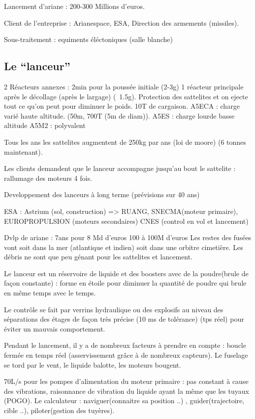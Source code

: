 \documentclass[a4paper,12pt]{article}
\begin{document}
Lancement d'ariane : 200-300 Millions d'euros.

Client de l'entreprise : Arianespace, ESA, Direction des armements (missiles).

Sous-traitement : equiments éléctoniques (salle blanche)

\subsection{Le ``lanceur''}

2 Réacteurs annexes : 2min pour la poussée initiale (2-3g)
1 réacteur principale après le décollage (après le largage) (~1.5g).
Protection des sattelites et on ejecte tout ce qu'on peut pour diminuer le poids.
10T de cargaison.
A5ECA : charge varié haute altitude. (50m, 700T (5m de diam)).
A5ES : charge lourde basse altitude
A5M2 : polyvalent

Tous les ans les sattelites augmentent de 250kg par ans (loi de moore) (6 tonnes maintenant).

Les clients demandent que le lanceur accompagne jusqu'au bout le sattelite : rallumage des moteurs 4 fois.

Developpement des lanceurs à long terme (prévisions sur 40 ans)

ESA : Astrium (sol, construction)  => RUANG, SNECMA(moteur primaire), EUROPROPULSION (moteurs secondaires)
      CNES (control en vol et lancement)

Dvlp de ariane : 7ans pour 8 Md d'euros
100 à 100M d'euros
Les restes des fusées vont soit dans la mer (atlantique et indien) soit dans une orbitre cimetière.
Les débris ne sont que peu génant pour les sattelites et lancement.

Le lanceur est un réservoire de liquide et des boosters avec de la poudre(brule de façon constante) : forme en étoile pour diminuer la quantité de poudre qui brule en même temps avec le temps.

Le contrôle se fait par verrins hydraulique ou des explosifs au niveau des séparations des étages de façon très précise (10 ms de tolérance) (tps réel) pour éviter un mauvais comportement. 

Pendant le lancement, il y a de nombreux facteurs à prendre en compte : boucle fermée en temps réel (asservissement grâce à de nombreux capteurs).
Le fuselage se tord par le vent, le liquide balotte, les moteurs bougent.

70L/s pour les pompes d'alimentation du moteur primaire : pas constant à cause des vibrations, raisonnance de vibration du liquide ayant la même que les tuyaux (POGO). 
Le calculateur : naviguer(connaitre sa position ..) , guider(trajectoire, cible ..), piloter(gestion des tuyères).
\end{document}
